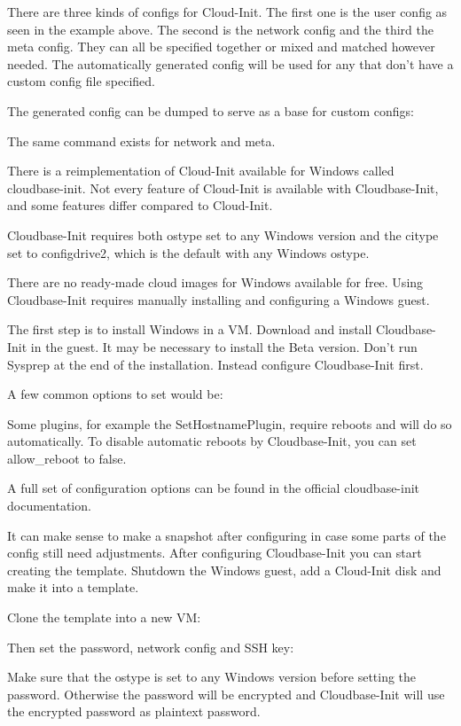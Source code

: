 There are three kinds of configs for Cloud-Init. The first one is the user config as seen in the example above. The second is the network config and the third the meta config. They can all be specified together or mixed and matched however needed. The automatically generated config will be used for any that don’t have a custom config file specified.

The generated config can be dumped to serve as a base for custom configs:

The same command exists for network and meta.

There is a reimplementation of Cloud-Init available for Windows called cloudbase-init. Not every feature of Cloud-Init is available with Cloudbase-Init, and some features differ compared to Cloud-Init.

Cloudbase-Init requires both ostype set to any Windows version and the citype set to configdrive2, which is the default with any Windows ostype.

There are no ready-made cloud images for Windows available for free. Using Cloudbase-Init requires manually installing and configuring a Windows guest.

The first step is to install Windows in a VM. Download and install Cloudbase-Init in the guest. It may be necessary to install the Beta version. Don’t run Sysprep at the end of the installation. Instead configure Cloudbase-Init first.

A few common options to set would be:

Some plugins, for example the SetHostnamePlugin, require reboots and will do so automatically. To disable automatic reboots by Cloudbase-Init, you can set allow_reboot to false.

A full set of configuration options can be found in the official cloudbase-init documentation.

It can make sense to make a snapshot after configuring in case some parts of the config still need adjustments. After configuring Cloudbase-Init you can start creating the template. Shutdown the Windows guest, add a Cloud-Init disk and make it into a template.

Clone the template into a new VM:

Then set the password, network config and SSH key:

Make sure that the ostype is set to any Windows version before setting the password. Otherwise the password will be encrypted and Cloudbase-Init will use the encrypted password as plaintext password.


